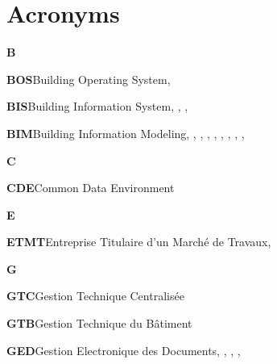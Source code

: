 \documentclass[a4paper,12pt]{article}
\begin{document}
\section{Acronyms}
\label{sec:orge67ae07}
\textbf{B}

\textbf{\hypertarget{gls-73}{BOS}}\hspace*{1em}Building Operating System\hspace*{.5em}\pageref{gls-5-use-1}, \pageref{gls-5-use-2}

\textbf{\hypertarget{gls-70}{BIS}}\hspace*{1em}Building Information System\hspace*{.5em}\pageref{gls-4-use-1}, \pageref{gls-4-use-2}, \pageref{gls-4-use-3}, \pageref{gls-4-use-4}

\textbf{\hypertarget{gls-69}{BIM}}\hspace*{1em}Building Information Modeling\hspace*{.5em}\pageref{gls-1-use-1}, \pageref{gls-1-use-2}, \pageref{gls-1-use-3}, \pageref{gls-1-use-4}, \pageref{gls-1-use-5}, \pageref{gls-1-use-6}, \pageref{gls-1-use-7}, \pageref{gls-1-use-8}, \pageref{gls-1-use-9}, \pageref{gls-1-use-10}

\textbf{C}

\textbf{\hypertarget{gls-93}{CDE}}\hspace*{1em}Common Data Environment\hspace*{.5em}\pageref{gls-17-use-1}

\textbf{E}

\textbf{\hypertarget{gls-151}{ETMT}}\hspace*{1em}Entreprise Titulaire d'un Marché de Travaux\hspace*{.5em}\pageref{gls-10-use-1}, \pageref{gls-10-use-2}

\textbf{G}

\textbf{\hypertarget{gls-176}{GTC}}\hspace*{1em}Gestion Technique Centralisée\hspace*{.5em}\pageref{gls-12-use-1}

\textbf{\hypertarget{gls-177}{GTB}}\hspace*{1em}Gestion Technique du Bâtiment\hspace*{.5em}\pageref{gls-11-use-1}

\textbf{\hypertarget{gls-169}{GED}}\hspace*{1em}Gestion Electronique des Documents\hspace*{.5em}\pageref{gls-6-use-1}, \pageref{gls-6-use-2}, \pageref{gls-6-use-3}, \pageref{gls-6-use-4}, \pageref{gls-6-use-5}
\end{document}
